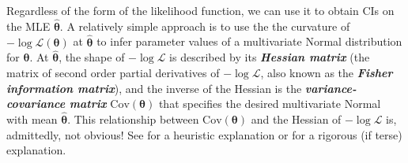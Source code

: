 \documentclass[]{interact}\usepackage[]{graphicx}\usepackage[]{xcolor}
\theoremstyle{plain}%
\theoremstyle{definition}
\theoremstyle{remark}
\newcommand{\term}[1]{{\bfseries\slshape#1}}
\newcommand{\thetavec}{{\bm{\theta}}}
\newcommand{\thetavechat}{{\bm{\hat\theta}}}
\newcommand{\lik}{{\mathcal L}}
\begin{document}
Regardless of the form of the likelihood function, we can use it to
obtain CIs on the MLE $\thetavechat$.  A relatively simple approach is
to use the the curvature of $-\log{\lik(\thetavec)}$ at $\thetavechat$
to infer parameter values of a multivariate Normal distribution for
$\thetavec$.  At $\thetavechat$, the shape of $-\log{\lik}$ is
described by its \term{Hessian matrix} (the matrix of second order
partial derivatives of $-\log{\lik}$, also known as the \term{Fisher
  information matrix}), and the inverse of the Hessian is the
\term{variance-covariance matrix} $\mathrm{Cov}(\thetavec)$ that
specifies the desired multivariate Normal with mean $\thetavechat$.
This relationship between $\mathrm{Cov}(\thetavec)$ and the Hessian of
$-\log{\lik}$ is, admittedly, not obvious!  See \citet[\S6.5]{Bolk08}
for a heuristic explanation or \citet[\S\S9.7, 9.10]{Wassermanall2010} for a rigorous (if terse) explanation.
\end{document}
